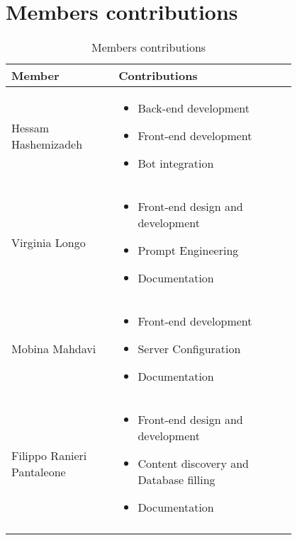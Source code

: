 \chapter{Members contributions}
\begin{longtable}
    {|m{0.3\linewidth}|m{0.5\linewidth}|}
            \hline
            \textbf{Member} & \textbf{Contributions}\\
            \hline
            \endhead
                Hessam Hashemizadeh &
                \begin{itemize}
                    \item Back-end development
                    \item Front-end development
                    \item Bot integration
                \end{itemize} \\
            \hline
                 Virginia Longo &
                 \begin{itemize}
                    \item Front-end design and development
                    \item Prompt Engineering
                    \item Documentation
                \end{itemize} \\
            \hline
                 Mobina Mahdavi &
                 \begin{itemize}
                    \item Front-end development
                    \item Server Configuration
                    \item Documentation
                \end{itemize} \\
            \hline
                Filippo Ranieri Pantaleone &
                \begin{itemize}
                    \item Front-end design and development
                    \item Content discovery and Database filling
                    \item Documentation
                \end{itemize} \\
            \hline
            \caption{Members contributions}
            \label{table:mem_contributions}
\end{longtable}
